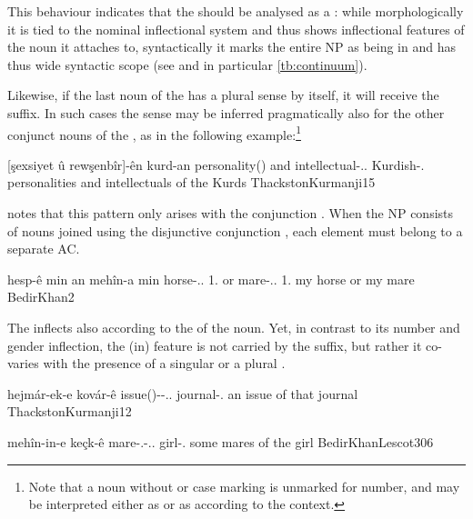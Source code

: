  
 This behaviour indicates that the \Kur \ez* should be analysed as a : while morphologically it is tied to the nominal inflectional system and thus shows inflectional features of the noun it attaches to, syntactically it marks the entire NP as being in \cst* and  has thus wide syntactic scope (see  and in particular \vref{tb:continuum}).
 
Likewise, if the last noun of the \prim has a plural sense by itself, it will receive the \pl* \ez* suffix. In such cases the \pl* sense may be inferred pragmatically also for the other conjunct nouns of the \prim, as in the following example:\footnote{Note that a \Kur noun without \ez* or \obl* case marking is unmarked for number, and may be interpreted either as \pl* or as \sg* according to the context.}
  
{[şexsiyet û rewşenbîr]-ên kurd-an}
{personality(\fem) and intellectual-\ez..\pl{} Kurdish-\obl.\pl{}}
{personalities and intellectuals of the Kurds}
{ThackstonKurmanji}{15}


 
  \citeauthor{BedirKhan}  notes that this pattern  only arises with the conjunction . When the \prim NP consists of nouns joined using the disjunctive conjunction , each element must belong to a separate AC.   
 
 {hesp-ê min an mehîn-a min}
 {horse-\ez..\masc{} 1\sg.\obl{} or mare-\ez..\fem{} 1\sg.\obl}
 {my horse or my mare}
 {BedirKhan}{2}
  
  
  The \Kur \ez* inflects also according to the  of the noun.  Yet, in contrast to its number and gender inflection, the (in) feature is  not carried by the \ez* suffix, but rather it co-varies  with the presence of a singular   \citep[158-160]{MacKenzie} or a plural   \citep[78]{BedirKhanLescot}. 
  
  {hejmár-ek-e kovár-ê}
  {issue(\fem)-\indef-\ez.\indef.\fem{} journal-\obl.\fem{}}
  {an issue of that journal}
  {ThackstonKurmanji}{12}\antipar
  
  
   \newpage
  {mehîn-in-e keçk-ê}
  {mare-\pl.\indef-\ez.\indef.\pl{} girl-\obl.\fem}
  {some mares of the girl}
  {BedirKhanLescot}{306}\antipar
    
